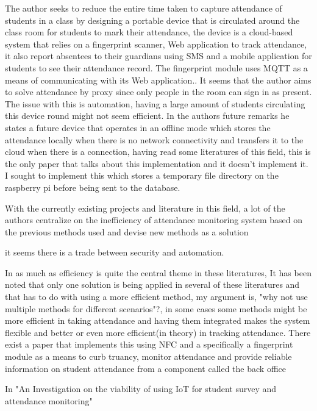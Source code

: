 The author seeks to reduce the entire time taken to capture attendance of students in a class by designing a portable device that is circulated around the class room for students to mark their attendance, the device is a cloud-based system that relies on a fingerprint scanner, Web application to track attendance, it also report absentees to their guardians using SMS and a mobile application for students to see their attendance record. The fingerprint module uses MQTT as a means of communicating with its Web application.\cite{Rachna}. It seems that the author aims to solve attendance by proxy since only people in the room can sign in as present. The issue with this is automation, having a large amount of students circulating this device round might not seem efficient. In the authors future remarks he states a future device that operates in an offline mode which stores the attendance locally when there is no network connectivity and transfers it to the cloud when there is a connection, having read some literatures of this field, this is the only paper that talks about this implementation and it doesn't implement it. I sought to implement this which stores a temporary file directory on the raspberry pi before being sent to the database.

With the currently existing projects and literature in this field, a lot of the authors centralize on the inefficiency of attendance monitoring system based on the previous methods used and devise new methods as a solution\cite{soe2018implementation, Rachna, Bhagat2020, Www2012, KaziARP, Tt2021}

it seems there is a trade between security and automation.

In as much as efficiency is quite the central theme in these literatures, It has been noted that only one solution is being applied in several of these literatures and that has to do with using a more efficient method, my argument is, "why not use multiple methods for different scenarios"?, in some cases some methods might be more efficient in taking attendance and having them integrated makes the system flexible and better or even more efficient(in theory) in tracking attendance. There exist a paper that implements this using NFC and a specifically a fingerprint module as a means to curb truancy, monitor attendance and provide reliable information on student attendance from a component called the back office\cite{6266137}

In "An Investigation on the viability of using IoT for student survey and attendance monitoring"

